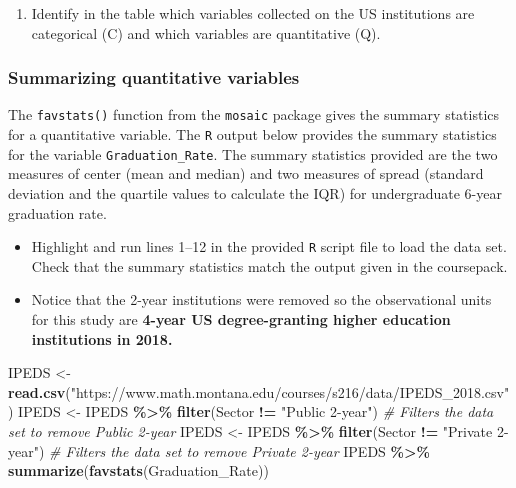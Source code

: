 \documentclass[
]{report}
\newenvironment{Shaded}{\begin{snugshade}}{\end{snugshade}}
\newcommand{\CommentTok}[1]{\textcolor[rgb]{0.56,0.35,0.01}{\textit{#1}}}
\newcommand{\FunctionTok}[1]{\textcolor[rgb]{0.13,0.29,0.53}{\textbf{#1}}}
\newcommand{\NormalTok}[1]{#1}
\newcommand{\OtherTok}[1]{\textcolor[rgb]{0.56,0.35,0.01}{#1}}
\newcommand{\SpecialCharTok}[1]{\textcolor[rgb]{0.81,0.36,0.00}{\textbf{#1}}}
\newcommand{\StringTok}[1]{\textcolor[rgb]{0.31,0.60,0.02}{#1}}
\providecommand{\tightlist}{%
  \setlength{\itemsep}{0pt}\setlength{\parskip}{0pt}}
\begin{document}
\begin{enumerate}
\def\labelenumi{\arabic{enumi}.}
\tightlist
\item
  Identify in the table which variables collected on the US institutions are categorical (C) and which variables are quantitative (Q).
\end{enumerate}

\subsubsection*{Summarizing quantitative variables}\label{summarizing-quantitative-variables}

The \texttt{favstats()} function from the \texttt{mosaic} package gives the summary statistics for a quantitative variable. The \texttt{R} output below provides the summary statistics for the variable \texttt{Graduation\_Rate}. The summary statistics provided are the two measures of center (mean and median) and two measures of spread (standard deviation and the quartile values to calculate the IQR) for undergraduate 6-year graduation rate.

\begin{itemize}
\item
  Highlight and run lines 1--12 in the provided \texttt{R} script file to load the data set. Check that the summary statistics match the output given in the coursepack.
\item
  Notice that the 2-year institutions were removed so the observational units for this study are \textbf{4-year US degree-granting higher education institutions in 2018.}
\end{itemize}

\begin{Shaded}
\begin{Highlighting}[]
\NormalTok{IPEDS }\OtherTok{\textless{}{-}} \FunctionTok{read.csv}\NormalTok{(}\StringTok{"https://www.math.montana.edu/courses/s216/data/IPEDS\_2018.csv"}\NormalTok{) }
\NormalTok{IPEDS }\OtherTok{\textless{}{-}}\NormalTok{ IPEDS }\SpecialCharTok{\%\textgreater{}\%}
  \FunctionTok{filter}\NormalTok{(Sector }\SpecialCharTok{!=} \StringTok{"Public 2{-}year"}\NormalTok{) }\CommentTok{\# Filters the data set to remove Public 2{-}year}
\NormalTok{IPEDS }\OtherTok{\textless{}{-}}\NormalTok{ IPEDS }\SpecialCharTok{\%\textgreater{}\%}
  \FunctionTok{filter}\NormalTok{(Sector }\SpecialCharTok{!=} \StringTok{"Private 2{-}year"}\NormalTok{) }\CommentTok{\# Filters the data set to remove Private 2{-}year}
\NormalTok{IPEDS }\SpecialCharTok{\%\textgreater{}\%}
    \FunctionTok{summarize}\NormalTok{(}\FunctionTok{favstats}\NormalTok{(Graduation\_Rate))}
\end{Highlighting}
\end{Shaded}
\end{document}
